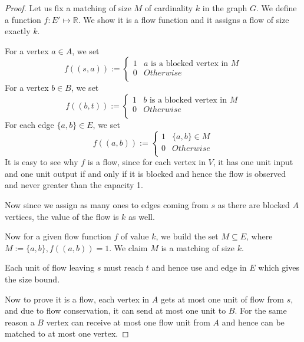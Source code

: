 \begin{proof}
	Let us fix a matching of size $M$ of cardinality $k$ in the graph $G$. We define a function $f:E'\mapsto \mathbb{R}$. We show it is a flow function and it assigns a flow of size exactly $k$.  	

	For a vertex $a \in A$, we set
	\begin{equation*}
		f((s, a)) :=
		\begin{cases}
			1& a \text{ is a blocked vertex in } M\\
			0& Otherwise\\
		\end{cases}
	\end{equation*}
	For a vertex $b \in B$, we set
	\begin{equation*}
		f((b, t)) :=
		\begin{cases}
			1& b \text{ is a blocked vertex in } M\\
			0& Otherwise\\
		\end{cases}
	\end{equation*}
	For each edge $\{a, b\} \in E$, we set
	\begin{equation*}
		f((a, b)) :=
		\begin{cases}
			1& \{a, b\} \in M\\
			0& Otherwise\\
		\end{cases}
	\end{equation*}
	It is easy to see why $f$ is a flow, since for each vertex in $V$, it has one unit input and one unit output if and only if it is blocked and hence the flow is observed and never greater than the capacity 1.

	Now since we assign as many ones to edges coming from $s$ as there are blocked $A$ vertices, the value of the flow is $k$ as well.

	Now for a given flow function $f$ of value $k$, we build the set $M \subseteq E$, where $M := \{a, b\}, f((a,b)) = 1$. We claim $M$ is a matching of size $k$.

	Each unit of flow leaving $s$ must reach $t$ and hence use and edge in $E$ which gives the size bound.

	Now to prove it is a flow, each vertex in $A$ gets at most one unit of flow from $s$, and due to flow conservation, it can send at most one unit to $B$. For the same reason a $B$ vertex can receive at most one flow unit from $A$ and hence can be matched to at most one vertex.
\end{proof}

